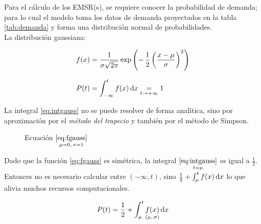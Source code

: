\documentclass[12pt]{article}
\begin{document}
Para el cálculo de los EMSR(s), se requiere conocer la probabilidad de demanda; para lo cual el modelo toma los datos de demanda proyectados en la tabla \ref{tab:demanda} y forma una distribución normal de probabilidades.\\


La distribución gaussiana:

\begin{align}
f(x) &= \dfrac{1}{\sigma\sqrt{2\pi}}\exp\left({-\,\dfrac{1}{2}\left(\dfrac{x-\mu}{\sigma}\right)^2}\right) \label{eq:fgauss} \\[8pt]
P(t) &= \int_{-\infty}^{t} f(x) \dif x \underset{t\to +\infty}{=} 1 \label{eq:intgauss}
\end{align}


La integral \eqref{eq:intgauss} no se puede resolver de forma analítica, sino por aproximación por el \emph{método del trapecio} y también por el método de Simpson.\\



\begin{figure}
\centering
{}
\caption{Ecuación $\underset{\mu = 0,\,\sigma = 1}{\text{\eqref{eq:fgauss}}}$}\label{fig:campana}
\end{figure}



Dado que la función \eqref{eq:fgauss} es simétrica, la integral $\underset{t = \mu}{\text{\eqref{eq:intgauss}}}$ es igual a $\frac{1}{2}$. Entonces no es necesario calcular entre $(-\infty, t)$, sino $\frac{1}{2} + \int_\mu^t f(x)\dif x$ lo que alivia muchos recursos computacionales.

\begin{align}
P(t) = \dfrac{1}{2} + \int_\mu^t \underset{(\mu, \, \sigma)}{f(x)}\dif x \label{eq:probgauss}
\end{align}
\end{document}

